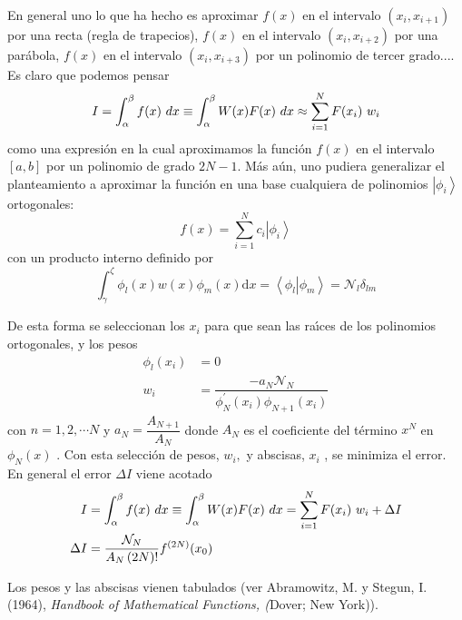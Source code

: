 \documentclass[spanish,titlepage,11pt]{article}
\begin{document}
En general uno lo que ha hecho es aproximar $f(x)$ en el intervalo $\left(
x_{i},x_{i+1}\right)  $ por una recta (regla de trapecios), $f(x)$ en el
intervalo $\left(  x_{i},x_{i+2}\right)  $ por una par\'{a}bola, $f(x)$ en el
intervalo $\left(  x_{i},x_{i+3}\right)  $ por un polinomio de tercer
grado.... Es claro que podemos pensar
\begin{equation}
I=\int_{\alpha}^{\beta}f(x)\ {\normalsize d}x\equiv\int_{\alpha}^{\beta
}W(x)F(x)\ {\normalsize d}x\approx\sum_{i=1}^{N}F(x_{i})\ w_{i}%
\end{equation}
como una expresi\'{o}n en la cual aproximamos la funci\'{o}n $f(x)$ en el
intervalo $\left[  a,b\right]  $ por un polinomio de grado $2N-1$. M\'{a}s
a\'{u}n, uno pudiera generalizar el planteamiento a aproximar la funci\'{o}n
en una base cualquiera de polinomios $\left|  \phi_{i}\right\rangle $
ortogonales:
\begin{equation}
f(x)=\sum_{i=1}^{N}c_{i}\left|  \phi_{i}\right\rangle
\end{equation}
con un producto interno definido por
\begin{equation}
\int_{\gamma}^{\zeta}\phi_{l}(x)w(x)\phi_{m}(x)\mathrm{d}x=\left\langle
\phi_{l}\right.  \left|  \phi_{m}\right\rangle =\mathcal{N}_{l}\delta_{lm}%
\end{equation}

De esta forma se seleccionan los $x_{i}$ para que sean las ra\'{\i}ces de los
polinomios ortogonales, y los pesos
\begin{align}
\phi_{l}(x_{i})  &  =0\\
w_{i}  &  =\dfrac{-a_{N}\mathcal{N}_{N}}{\phi_{N}^{\prime}(x_{i})\phi
_{N+1}(x_{i})}%
\end{align}
con $n=1,2,\cdots N$ y $a_{N}=\dfrac{A_{N+1}}{A_{N}}$ donde $A_{N}$ es el
coeficiente del t\'{e}rmino $x^{N}$ en $\phi_{N}(x)$ . Con esta selecci\'{o}n
de pesos, $w_{i},$ y abscisas, $x_{i}$ , se minimiza el error. En general el
error $\Delta I$ viene acotado
\begin{align}
I  &  =\int_{\alpha}^{\beta}f(x)\ {\normalsize d}x\equiv\int_{\alpha}^{\beta
}W(x)F(x)\ {\normalsize d}x=\sum_{i=1}^{N}F(x_{i})\ w_{i}+\Delta I\\
\Delta I  &  =\dfrac{\mathcal{N}_{N}}{A_{N}\left(  2N\right)  !}f^{\left(
2N\right)  }(x_{0})
\end{align}

Los pesos y las abscisas vienen tabulados (ver Abramowitz, M. y Stegun, I.
(1964), \textit{Handbook of Mathematical Functions, (}Dover; New York)).
\end{document}
